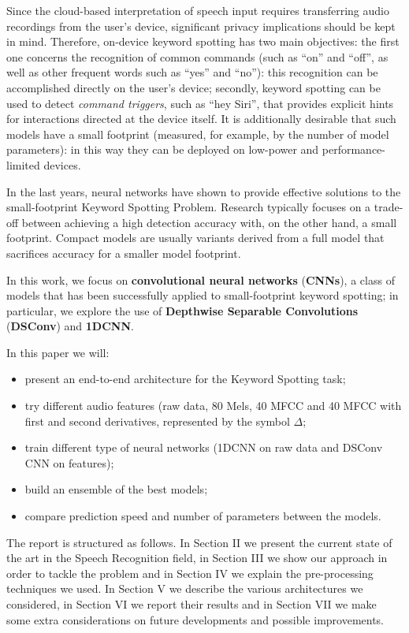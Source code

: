 \documentclass[conference]{IEEEtran}
\begin{document}
Since the cloud-based interpretation of speech input requires transferring audio recordings from the user’s device, significant privacy implications should be kept in mind. Therefore, on-device keyword spotting has two main objectives: the first one concerns the recognition of common commands (such as “on” and “off”, as well as other frequent words such as “yes” and “no”): this recognition can be accomplished directly on the user’s device; secondly, keyword spotting can be used to detect \textit{command triggers}, such as “hey Siri”, that provides explicit hints for interactions directed at the device itself. It is additionally desirable that such models have a small footprint (measured, for example, by the number of model parameters): in this way they can be deployed on low-power and performance-limited devices.

In the last years, neural networks have shown to provide effective solutions to the small-footprint Keyword Spotting Problem. Research typically focuses on a trade-off between achieving a high detection accuracy with, on the other hand, a small footprint. Compact models are usually variants derived from a full model that sacrifices accuracy for a smaller model footprint.

In this work, we focus on \textbf{convolutional neural networks} (\textbf{CNNs}), a class of models that has been successfully applied to small-footprint keyword spotting; in particular, we explore the use of \textbf{Depthwise Separable Convolutions} (\textbf{DSConv}) and \textbf{1DCNN}.

In this paper we will: 
\begin{itemize}
\setlength{\itemsep}{0pt}
  \setlength{\parskip}{0pt}
  \setlength{\parsep}{0pt}
\item present an end-to-end architecture for the Keyword Spotting task;
\item try different audio features (raw data, 80 Mels, 40 MFCC and 40 MFCC with first and second derivatives, represented by the symbol $\Delta$;
\item train different type of neural networks (1DCNN on raw data and DSConv CNN on features);
\item build an ensemble of the best models;
\item compare prediction speed and number of parameters between the models.
\end{itemize}

The report is structured as follows. In Section II we present the current state of the art in the Speech Recognition field, in Section III we show our approach in order to tackle the problem and in Section IV we explain the pre-processing techniques we used. In Section V we describe the various architectures we considered, in Section VI we report their results and in Section VII we make some extra considerations on future developments and possible improvements.
\end{document}
